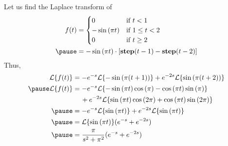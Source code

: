 \documentclass{beamer}
\DeclareMathOperator{\step}{\textbf{step}}
\begin{document}
\begin{frame}
\begin{example}
Let us find the Laplace transform of
\begin{equation*}
\begin{aligned}
f(t)&=
\begin{cases}
0 & \text{if}~t<1 \\
-\sin[\pi t] & \text{if}~1\leq t< 2 \\
0 & \text{if}~t\geq 2
\end{cases}\\\pause
&=-\sin[\pi t]\cdot\left[\step(t-1)-\step(t-2)\right]
\end{aligned}
\end{equation*}\pause
Thus,
\begin{equation*}
\begin{aligned}
\laplace\{f(t)\}&=-e^{-s}\laplace\{-\sin[\pi (t+1)]\}+e^{-2s}\laplace\{\sin[\pi (t+2)]\}\\\pause
\laplace\{f(t)\}&=-e^{-s}\laplace\{-\sin[\pi t]\cos[\pi]-\cos[\pi t]\sin[\pi]\}\\
&\hspace{4.2mm}+e^{-2s}\laplace\{\sin[\pi t]\cos[2\pi]+\cos[\pi t]\sin[2\pi]\}\\\pause
&=-e^{-s}\laplace\{\sin[\pi t]\}+e^{-2s}\laplace\{\sin[\pi t]\}\\\pause
&=\laplace\{\sin[\pi t]\}(e^{-s}+e^{-2s})\\\pause
&=\dfrac{\pi}{s^2+\pi^2}(e^{-s}+e^{-2s})
\end{aligned}
\end{equation*}
\end{example}
\end{frame}
\end{document}
